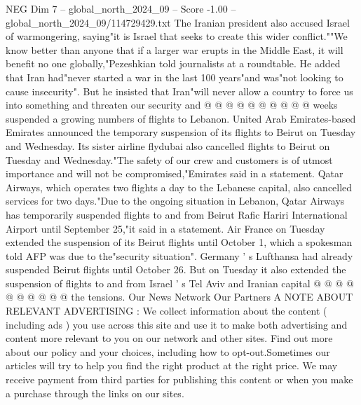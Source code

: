 \begin{textsample}{NEG Dim 7 – global\_north\_2024\_09 – Score -1.00 – global\_north\_2024\_09/114729429.txt}
The Iranian president also accused Israel of warmongering, saying"it is Israel that seeks to create this wider conflict.""We know better than anyone that if a larger war erupts in the Middle East, it will benefit no one globally,"Pezeshkian told journalists at a roundtable.
He added that Iran had"never started a war in the last 100 years"and was"not looking to cause insecurity".
But he insisted that Iran"will never allow a country to force us into something and threaten our security and @ @ @ @ @ @ @ @ @ @ weeks suspended a growing numbers of flights to Lebanon.
United Arab Emirates-based Emirates announced the temporary suspension of its flights to Beirut on Tuesday and Wednesday.
Its sister airline flydubai also cancelled flights to Beirut on Tuesday and Wednesday."The safety of our crew and customers is of utmost importance and will not be compromised,"Emirates said in a statement.
Qatar Airways, which operates two flights a day to the Lebanese capital, also cancelled services for two days."Due to the ongoing situation in Lebanon, Qatar Airways has temporarily suspended flights to and from Beirut Rafic Hariri International Airport until September 25,"it said in a statement.
Air France on Tuesday extended the suspension of its Beirut flights until October 1, which a spokesman told AFP was due to the"security situation".
Germany ' s Lufthansa had already suspended Beirut flights until October 26.
But on Tuesday it also extended the suspension of flights to and from Israel ' s Tel Aviv and Iranian capital @ @ @ @ @ @ @ @ @ @ the tensions.
Our News Network Our Partners A NOTE ABOUT RELEVANT ADVERTISING : We collect information about the content ( including ads ) you use across this site and use it to make both advertising and content more relevant to you on our network and other sites.
Find out more about our policy and your choices, including how to opt-out.Sometimes our articles will try to help you find the right product at the right price.
We may receive payment from third parties for publishing this content or when you make a purchase through the links on our sites.

\end{textsample}
